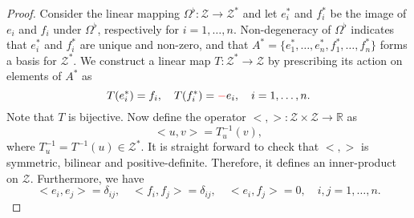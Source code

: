 \begin{proof}
Consider the linear mapping $\Omega^{\flat}:\mathcal Z \to \mathcal Z^*$ and let $e_i^*$ and $f_i^*$ be the image of $e_i$ and $f_i$ under $\Omega^{\flat}$, respectively for $i=1,\dots,n$. Non-degeneracy of $\Omega^{\flat}$ indicates that $e_i^*$ and $f_i^*$ are unique and non-zero, and that $A^*=\{e_1^*,\dots,e_n^*,f_1^*,\dots,f_n^*\}$ forms a basis for $\mathcal Z^*$. We construct a linear map $T:\mathcal Z^* \to \mathcal Z$ by prescribing its action on elements of $A^*$ as
\begin{equation*}
	T(e_i^*) = f_i, \quad T(f_i^*) = {\color{red} -}e_i, \quad i=1,\dots,n.
\end{equation*}
Note that $T$ is bijective. Now define the operator $<,>:\mathcal Z\times \mathcal Z \to \mathbb R$ as
\begin{equation*}
	<u,v> = T^{-1}_{u} (v),	
\end{equation*}
where $T^{-1}_{u} = T^{-1}(u) \in \mathcal Z^*$. It is straight forward to check that $<,>$ is symmetric, bilinear and positive-definite. Therefore, it defines an inner-product on $\mathcal Z$. Furthermore, we have
\begin{equation*}
	<e_i,e_j> = \delta_{ij},\quad <f_i,f_j> = \delta_{ij}, \quad <e_i,f_j> = 0, \quad i,j=1,\dots,n.
\end{equation*}
\end{proof}

